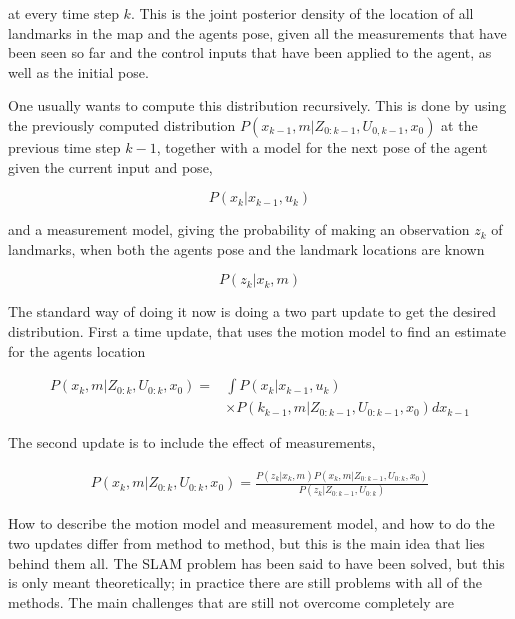 at every time step $k$. This is the joint posterior density of the location of all landmarks in the map and the agents pose, given all the measurements that have been seen so far and the control inputs that have been applied to the agent, as well as the initial pose. 

One usually wants to compute this distribution recursively. This is done by using the previously computed distribution $P(x_{k-1},m|Z_{0:k-1},U_{0,k-1},x_0)$ at the previous time step $k-1$, together with a model for the next pose of the agent given the current input and pose, 

\begin{equation}
    P(x_k|x_{k-1},u_k)
\end{equation}

and a measurement model, giving the probability of making an observation $z_k$ of landmarks, when both the agents pose and the landmark locations are known

\begin{equation}
    P(z_k|x_k,m)
\end{equation}

The standard way of doing it now is doing a two part update to get the desired distribution. First a time update, that uses the motion model to find an estimate for the agents location


\begin{align}
    P(x_k,m|Z_{0:k},U_{0:k}, x_0) 
     = & \int P(x_k|x_{k-1},u_k) \\
    & \times P(k_{k-1},m|Z_{0:k-1},U_{0:k-1},x_0)dx_{k-1}
\end{align}

The second update is to include the effect of measurements, 

\begin{equation}
\begin{split}
    P(x_k,m|Z_{0:k},U_{0:k},x_0) 
    = \frac{P(z_k|x_k,m)P(x_k,m|Z_{0:k-1},U_{0:k},x_0)}{P(z_k|Z_{0:k-1},U_{0:k})}
\end{split}
\end{equation}

How to describe the motion model and measurement model, and how to do the two updates differ from method to method, but this is the main idea that lies behind them all. The SLAM problem has been said to have been solved, but this is only meant theoretically; in practice there are still problems with all of the methods. The main challenges that are still not overcome completely are 

